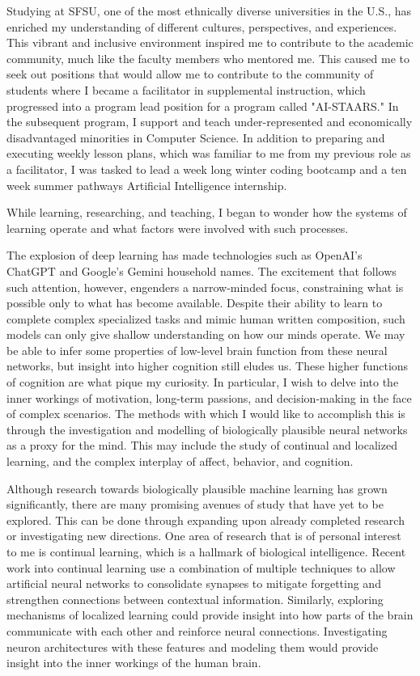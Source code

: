 \documentclass[12pt]{article}
\begin{document}
Studying at SFSU, one of the most ethnically diverse universities in the U.S., has enriched my understanding of different cultures,
perspectives, and experiences. This vibrant and inclusive environment inspired me to contribute to the academic community, much like the
faculty members who mentored me. This caused me to seek out positions that would allow me to contribute to the community of students where I
became a facilitator in supplemental instruction, which progressed into a program lead position for a program called "AI-STAARS." In the
subsequent program, I support and teach under-represented and economically disadvantaged minorities in Computer Science.  In addition to
preparing and executing weekly lesson plans, which was familiar to me from my previous role as a facilitator, I was tasked to lead a week
long winter coding bootcamp and a ten week summer pathways Artificial Intelligence internship.


While learning, researching, and teaching, I began to wonder how the systems of learning operate and what factors were involved with such
processes.


The explosion of deep learning has made technologies such as OpenAI's ChatGPT and Google's Gemini household names. The excitement that
follows such attention, however, engenders a narrow-minded focus, constraining what is possible only to what has become available. Despite
their ability to learn to complete complex specialized tasks and mimic human written composition, such models can only give shallow
understanding on how our minds operate. We may be able to infer some properties of low-level brain function from these neural networks, but
insight into higher cognition still eludes us. These higher functions of cognition are what pique my curiosity. In particular, I wish to
delve into the inner workings of motivation, long-term passions, and decision-making in the face of complex scenarios. The methods with
which I would like to accomplish this is through the investigation and modelling of biologically plausible neural networks as a proxy for
the mind. This may include the study of continual and localized learning, and the complex interplay of affect, behavior, and cognition.


Although research towards biologically plausible machine learning has grown significantly, there are many promising avenues of study that
have yet to be explored. This can be done through expanding upon already completed research or investigating new directions. One area of
research that is of personal interest to me is continual learning, which is a hallmark of biological intelligence. Recent work into
continual learning use a combination of multiple techniques to allow artificial neural networks to consolidate synapses to mitigate
forgetting and strengthen connections between contextual information. Similarly, exploring mechanisms of localized learning could provide
insight into how parts of the brain communicate with each other and reinforce neural connections. Investigating neuron architectures with
these features and modeling them would provide insight into the inner workings of the human brain.
\end{document}
